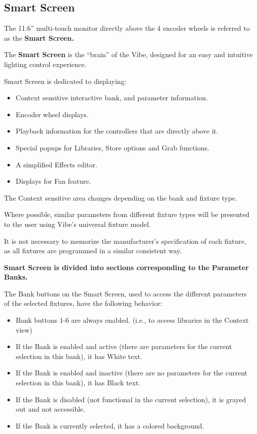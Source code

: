 \documentclass[
]{article}
\begin{document}
\hypertarget{Smart-Screen-7.2}{%
\subsection{Smart Screen}\label{Smart-Screen-7.2}}

The 11.6'' multi-touch monitor directly above the 4 encoder wheels is referred to as the \textbf{Smart Screen.}

The \textbf{Smart Screen} is the ``brain'' of the Vibe, designed for an easy and intuitive lighting control experience.

Smart Screen is dedicated to displaying:

\begin{itemize}
\item
  Context sensitive interactive bank, and parameter information.
\item
  Encoder wheel displays.
\item
  Playback information for the controllers that are directly above it.
\item
  Special popups for Libraries, Store options and Grab functions.
\item
  A simplified Effects editor.
\item
  Displays for Fan feature.
\end{itemize}

The Context sensitive area changes depending on the bank and fixture type.

Where possible, similar parameters from different fixture types will be presented to the user using Vibe's universal fixture model.

It is not necessary to memorize the manufacturer's specification of each fixture, as all fixtures are programmed in a similar consistent way.

\textbf{Smart Screen is divided into sections corresponding to the Parameter Banks.}

The Bank buttons on the Smart Screen, used to access the different parameters of the selected fixtures, have the following behavior:

\begin{itemize}
\item
  Bank buttons 1-6 are always enabled. (i.e., to access libraries in the Context view)
\item
  If the Bank is enabled and active (there are parameters for the current selection in this bank), it has White text.
\item
  If the Bank is enabled and inactive (there are no parameters for the current selection in this bank), it has Black text.
\item
  If the Bank is disabled (not functional in the current selection), it is grayed out and not accessible.
\item
  If the Bank is currently selected, it has a colored background.
\end{itemize}
\end{document}
